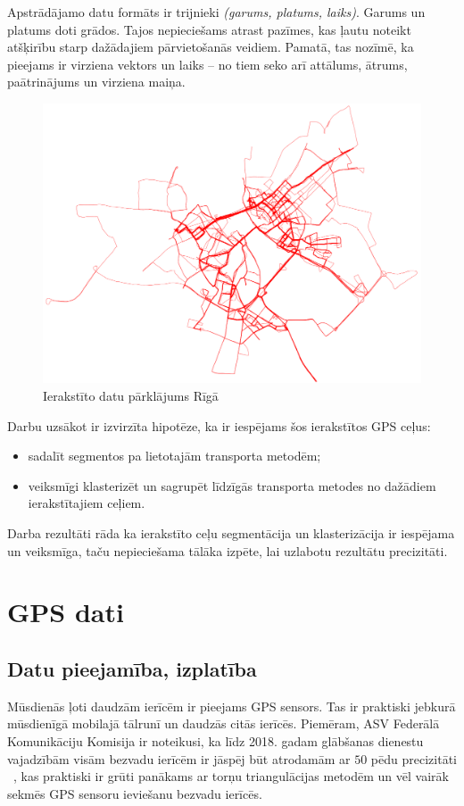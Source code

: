 \documentclass{ludis}
\begin{document}
Apstrādājamo datu formāts ir trijnieki \emph{(garums, platums, laiks)}. Garums un platums doti 
grādos. Tajos nepieciešams atrast pazīmes, kas ļautu noteikt atšķirību starp dažādajiem 
pārvie\-tošanās veidiem. Pamatā, tas nozīmē, ka pieejams ir virziena vektors un laiks -- no tiem
seko arī attālums, ātrums, paātrinājums un virziena maiņa.

\begin{figure}
  \centering
  \includegraphics[scale=0.5]{img/all_trails}
  \caption{Ierakstīto datu pārklājums Rīgā}
  \label{fig:all_trails}
\end{figure}

Darbu uzsākot ir izvirzīta hipotēze, ka ir iespējams šos ierakstītos GPS ceļus:
\begin{itemize}
\item sadalīt segmentos pa lietotajām transporta metodēm;
\item veiksmīgi klasterizēt un sagrupēt līdzīgās transporta metodes no dažādiem ierakstītajiem ceļiem.
\end{itemize}


Darba rezultāti rāda ka ierakstīto ceļu segmentācija un klasterizācija ir iespējama un \linebreak 
veiksmīga, taču nepieciešama tālāka izpēte, lai uzlabotu rezultātu precizitāti.

\chapter{GPS dati}
\section{Datu pieejamība, izplatība}
Mūsdienās ļoti daudzām ierīcēm ir pieejams GPS sensors. Tas ir praktiski jebkurā mūs\-dienīgā mobilajā
tālrunī un daudzās citās ierīcēs. Piemēram, ASV Federālā Komunikāciju \linebreak Komisija ir
noteikusi, ka līdz
2018. gadam glābšanas dienestu vajadzībām visām bezvadu ierīcēm ir jāspēj būt atrodamām 
ar $50$ pēdu precizitāti ~\cite{fcc_e911}, kas praktiski ir grūti panākams ar torņu triangulācijas 
metodēm un vēl vairāk sekmēs GPS sensoru ieviešanu bezvadu ierīcēs.
\end{document}

